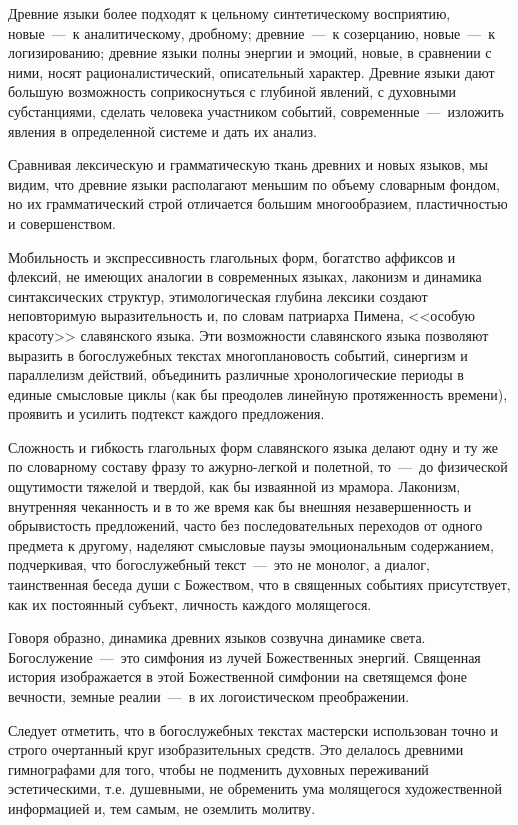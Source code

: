 \documentclass[11pt,a4paper,oneside]{memoir}
\begin{document}
    Древние языки более подходят к цельному синтетическому восприятию, новые~---~к аналитическому, дробному; древние~---~к созерцанию, новые~---~к логизированию; древние языки полны энергии и эмоций, новые, в сравнении с ними, носят рационалистический, описательный характер. Древние языки дают большую возможность соприкоснуться с глубиной явлений, с духовными субстанциями, сделать человека участником событий, современные~---~изложить явления в определенной системе и дать их анализ.
    
    Сравнивая лексическую и грамматическую ткань древних и новых языков, мы видим, что древние языки располагают меньшим по объему словарным фондом, но их грамматический строй отличается большим многообразием, пластичностью и совершенством.
    
    Мобильность и экспрессивность глагольных форм, богатство аффиксов и флексий, не имеющих аналогии в современных языках, лаконизм и динамика синтаксических структур, этимологическая глубина лексики создают неповторимую выразительность и, по словам патриарха Пимена, <<особую красоту>> славянского языка. Эти возможности славянского языка позволяют выразить в богослужебных текстах многоплановость событий, синергизм и параллелизм действий, объединить различные хронологические периоды в единые смысловые циклы (как бы преодолев линейную протяженность времени), проявить и усилить подтекст каждого предложения.
    
    Сложность и гибкость глагольных форм славянского языка делают одну и ту же по словарному составу фразу то ажурно-легкой и полетной, то~---~до физической ощутимости тяжелой и твердой, как бы изваянной из мрамора. Лаконизм, внутренняя чеканность и в то же время как бы внешняя незавершенность и обрывистость предложений, часто без последовательных переходов от одного предмета к другому, наделяют смысловые паузы эмоциональным содержанием, подчеркивая, что богослужебный текст~---~это не монолог, а диалог, таинственная беседа души с Божеством, что в священных событиях присутствует, как их постоянный субъект, личность каждого молящегося.
    
    Говоря образно, динамика древних языков созвучна динамике света. Богослужение~---~это симфония из лучей Божественных энергий. Священная история изображается в этой Божественной симфонии на светящемся фоне вечности, земные реалии~---~в их логоистическом преображении.
    
    Следует отметить, что в богослужебных текстах мастерски использован точно и строго очертанный круг изобразительных средств. Это делалось древними гимнографами для того, чтобы не подменить духовных переживаний эстетическими, т.е. душевными, не обременить ума молящегося художественной информацией и, тем самым, не оземлить молитву.
    
\end{document}
